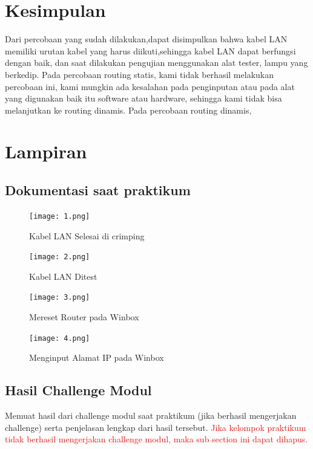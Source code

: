 \section{Kesimpulan}
Dari percobaan yang sudah dilakukan,dapat disimpulkan bahwa kabel LAN memiliki urutan kabel yang harus diikuti,sehingga
kabel LAN dapat berfungsi dengan baik, dan saat dilakukan pengujian menggunakan alat tester, lampu yang berkedip.
Pada percobaan routing statis, kami tidak berhasil melakukan percobaan ini, kami mungkin ada kesalahan pada penginputan
atau pada alat yang digunakan baik itu software atau hardware, sehingga kami tidak bisa melanjutkan ke routing dinamis. Pada percobaan routing dinamis,

\section{Lampiran}
\subsection{Dokumentasi saat praktikum}
	\begin{figure}[H]
		\centering
		\texttt{[image: 1.png]}
		\caption{Kabel LAN Selesai di crimping}
		\label{fig:gambar1}
	\end{figure}
    	\begin{figure}[H]
		\centering
		\texttt{[image: 2.png]}
		\caption{Kabel LAN Ditest}
		\label{fig:gambar1}
	\end{figure}

    \begin{figure}[H]
        \centering
        \texttt{[image: 3.png]}
        \caption{Mereset Router pada Winbox}
        \label{fig:gambar1}
    \end{figure}

    \begin{figure}[H]
        \centering
        \texttt{[image: 4.png]}
        \caption{Menginput Alamat IP pada Winbox}
        \label{fig:gambar1}
    \end{figure}
    


\subsection{Hasil Challenge Modul}
Memuat hasil dari challenge modul saat praktikum (jika berhasil mengerjakan challenge) serta penjelasan lengkap dari hasil tersebut. 
\textcolor{red}{Jika kelompok praktikum tidak berhasil mengerjakan challenge modul, maka sub section ini dapat dihapus.}
